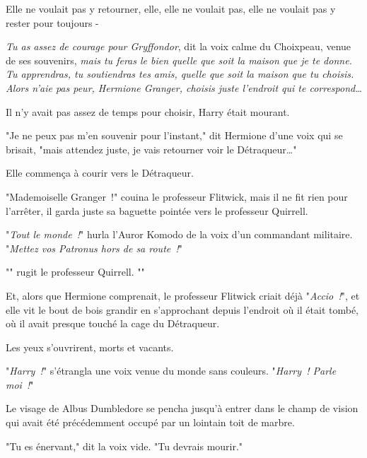 Elle ne voulait pas y retourner, elle, elle ne voulait pas, elle ne voulait pas y rester pour toujours -

\emph{Tu as assez de courage pour Gryffondor}, dit la voix calme du Choixpeau, venue de ses souvenirs, \emph{mais tu feras le bien quelle que soit la maison que je te donne. Tu apprendras, tu soutiendras tes amis, quelle que soit la maison que tu choisis. Alors n'aie pas peur, Hermione Granger, choisis juste l'endroit qui te correspond…}

Il n'y avait pas assez de temps pour choisir, Harry était mourant.

"Je ne peux pas m'en souvenir pour l'instant," dit Hermione d'une voix qui se brisait, "mais attendez juste, je vais retourner voir le Détraqueur…"

Elle commença à courir vers le Détraqueur.

"Mademoiselle Granger~!" couina le professeur Flitwick, mais il ne fit rien pour l'arrêter, il garda juste sa baguette pointée vers le professeur Quirrell.

"\emph{Tout le monde~!}" hurla l'Auror Komodo de la voix d'un commandant militaire. "\emph{Mettez vos Patronus hors de sa route~!}"

"" rugit le professeur Quirrell. ""

Et, alors que Hermione comprenait, le professeur Flitwick criait déjà "\emph{Accio~!}", et elle vit le bout de bois grandir en s'approchant depuis l'endroit où il était tombé, où il avait presque touché la cage du Détraqueur.

\later

Les yeux s'ouvrirent, morts et vacants.

"\emph{Harry~!}" s'étrangla une voix venue du monde sans couleurs. "\emph{Harry~! Parle moi~!}"

Le visage de Albus Dumbledore se pencha jusqu'à entrer dans le champ de vision qui avait été précédemment occupé par un lointain toit de marbre.

"Tu es énervant," dit la voix vide. "Tu devrais mourir."

